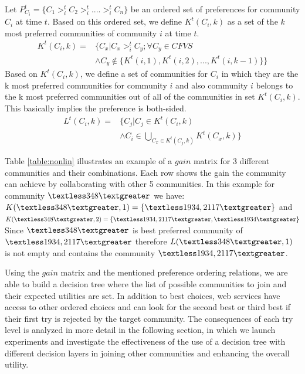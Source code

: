 \documentclass[10pt,journal,cspaper,compsoc]{IEEEtran}
\begin{document}
Let $P_{C_i}^t = \{C_1 >_{i}^t C_2 >_{i}^t .... >_{i}^t C_n\}$ be an ordered set of preferences for community $C_i$ at time $t$. Based on this ordered set, we define $K^t(C_i, k)$ as a set of the $k$ most preferred communities of community $i$ at time $t$.
\begin{equation}\label{h_t_pref_top}
\begin{split}				
K^t(C_i, k) = &\Big\{C_x | C_x >_{i}^t C_y; \forall C_y \in CFVS\ \\
				      &\wedge C_y \notin \{K^t(i, 1),K^t(i, 2),...,K^t(i, k-1)\} \Big\}				
\end{split}
\end{equation}
Based on $K^t(C_i, k)$, we define a set of communities for $C_i$ in which they are the k most preferred communities for community $i$ and also community $i$ belongs to the k most preferred communities out of all of the communities in set $K^t(C_i, k)$. This basically implies the preference is both-sided.
\begin{equation}\label{l_t_top_both}
\begin{split}	
L^t(C_i,k) = &\Big\{C_j | C_j \in K^t(C_i, k) \\
             &\wedge C_i \in \bigcup_{C_x \in K^t(C_j, k)}K^t(C_x, k)\Big\}
\end{split}
\end{equation}

Table \ref{table:nonlin} illustrates an example of a $gain$ matrix for 3 different communities and their combinations. Each row shows the gain the community can achieve by collaborating with other 5 communities. In this example for community $\textless 348 \textgreater$ we have: \\
$K(\textless 348 \textgreater, 1) = \{\textless1934, 2117\textgreater\}$ and \\
$K(\textless 348 \textgreater, 2) = \{\textless1934, 2117\textgreater, \textless1934\textgreater\}$ \\
Since $\textless 348 \textgreater$ is best preferred community of $\textless 1934, 2117 \textgreater$ therefore $L(\textless 348 \textgreater, 1)$ is not empty and contains the community $\textless1934, 2117\textgreater$.

Using the $gain$ matrix and the mentioned preference ordering relations, we are able to build a decision tree where the list of possible communities to join and their expected utilities are set.
In addition to best choices, web services have access to other ordered choices and can look for the second best or third best if their first try is rejected by the target community. The consequences of each try level is analyzed in more detail in the following section, in which we launch experiments and investigate the effectiveness of the use of a decision tree with different decision layers in joining other communities and enhancing the overall utility. 
\end{document}
